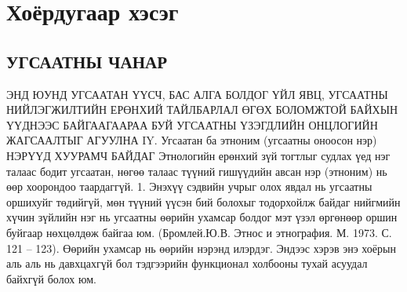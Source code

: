\chapter{Хоёрдугаар хэсэг}

\section{УГСААТНЫ ЧАНАР}
ЭНД ЮУНД УГСААТАН ҮҮСЧ, БАС АЛГА БОЛДОГ ҮЙЛ ЯВЦ, УГСААТНЫ НИЙЛЭГЖИЛТИЙН ЕРӨНХИЙ ТАЙЛБАРЛАЛ ӨГӨХ БОЛОМЖТОЙ БАЙХЫН ҮҮДНЭЭС БАЙГААГААРАА БУЙ УГСААТНЫ ҮЗЭГДЛИЙН ОНЦЛОГИЙН ЖАГСААЛТЫГ АГУУЛНА
IY. Угсаатан ба этноним (угсаатны оноосон нэр)
НЭРҮҮД ХУУРАМЧ БАЙДАГ
Этнологийн ерөнхий зүй тогтлыг судлах үед нэг талаас бодит угсаатан, нөгөө талаас түүний гишүүдийн авсан нэр (этноним) нь өөр хоорондоо таардаггүй.
1. Энэхүү сэдвийн учрыг олох явдал нь угсаатны оршихуйг төдийгүй, мөн түүний үүсэн бий болохыг тодорхойлж байдаг нийгмийн хүчин зүйлийн нэг нь угсаатны өөрийн ухамсар болдог мэт үзэл өргөнөөр оршин буйгаар нөхцөлдөж байгаа юм. (Бромлей.Ю.В. Этнос и этнография. М. 1973. С. 121 – 123). Өөрийн ухамсар нь өөрийн нэрэнд илэрдэг. Эндээс хэрэв энэ хоёрын аль аль нь давхцахгүй бол тэдгээрийн функционал холбооны тухай асуудал байхгүй болох юм.
